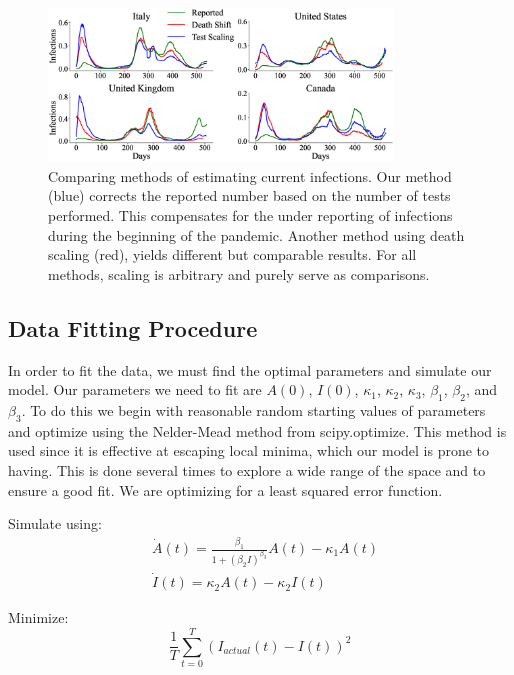 \documentclass[letterpaper, 10 pt, conference]{ieeeconf}  %
\begin{document}
\begin{figure}
\begin{centering}
\includegraphics[width=3.6in]{DifferentMethods}
\par\end{centering}
\caption{\label{fig:InfectionMethods} Comparing  methods of estimating current infections. Our method (blue) corrects the reported number based on the number of tests performed. This compensates for the under reporting of infections during the beginning of the pandemic. Another method using death scaling (red), yields different but comparable results. For all methods, scaling is arbitrary and purely serve as comparisons.}
\end{figure}


\subsection{Data Fitting Procedure}

In order to fit the data, we must find the optimal parameters and simulate our model. Our parameters we need to fit are $A(0)$, $I(0)$, $\kappa_1$, $\kappa_2$, $\kappa_3$, $\beta_1$, $\beta_2$, and $\beta_3$. To do this we begin with reasonable random starting values of parameters and optimize using the Nelder-Mead method from scipy.optimize. This method is used since it is effective at escaping local minima, which our model is prone to having. This is done several times to explore a wide range of the space and to ensure a good fit. We are optimizing for a least squared error function.

Simulate using:
\begin{equation*} 
\begin{split}
&\dot{A}(t) = {\frac{\beta_1}{1+(\beta_2 I)^{\beta_3}}}A(t) - \kappa_1 A(t) \\
& \dot{I}(t) = \kappa_2 A(t) - \kappa_2 I(t)
\end{split}
\end{equation*}

Minimize:
\begin{equation*}
\frac{1}{T} \sum_{t=0}^{T}(I_{actual}(t) - I(t))^2
\end{equation*}
\end{document}
